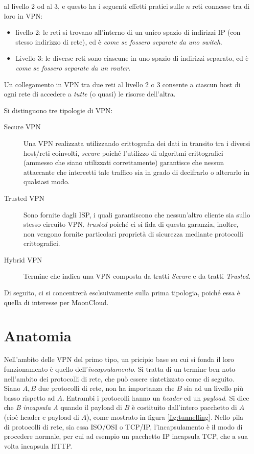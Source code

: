 al livello 2 od al 3, e questo ha i seguenti effetti pratici sulle $n$ reti connesse
tra di loro in VPN:
\begin{itemize}
	\item livello 2: le reti si trovano all'interno di un unico spazio di indirizzi IP
	      (con stesso indirizzo di rete), ed è \textit{come se fossero separate da uno switch}.
	\item Livello 3: le diverse reti sono ciascune in uno spazio di indirizzi separato,
	      ed è \textit{come se fossero separate da un router}.
\end{itemize}
Un collegamento in VPN tra due reti al livello 2 o 3 consente a ciascun host di ogni rete di accedere
a \textit{tutte} (o quasi) le risorse
dell'altra.


Si distinguono tre tipologie di VPN:
\begin{description}
	\item[Secure VPN]Una VPN realizzata utilizzando crittografia dei dati in transito
	tra i diversi host/reti coinvolti, \textit{secure} poiché l'utilizzo di algoritmi
	crittografici (ammesso che siano utilizzati correttamente) garantisce che nessun
	attaccante che intercetti tale traffico sia in grado di decifrarlo o alterarlo in
	qualsiasi modo.
	\item[Trusted VPN]Sono fornite dagli ISP, i quali garantiscono che nessun'altro
	cliente sia sullo stesso circuito VPN, \textit{trusted} poiché ci si fida di
	questa garanzia, inoltre, non vengono fornite particolari proprietà di sicurezza
	mediante protocolli crittografici.
	\item[Hybrid VPN]Termine che indica una VPN composta da tratti \textit{Secure}
	e da tratti \textit{Trusted}.
\end{description}
Di seguito, ci si concentrerà esclsuivamente sulla prima tipologia, poiché essa è
quella di interesse per MoonCloud.


\section{Anatomia}
Nell'ambito delle VPN del primo tipo, un pricipio base su cui si fonda il loro
funzionamento è quello dell'\textit{incapsulamento}. Si tratta di un termine
ben noto nell'ambito dei protocolli di rete, che può essere sintetizzato come
di seguito. Siano $A, B$ due protocolli di rete, non ha importanza
che $B$ sia ad un livello più basso rispetto ad $A$. Entrambi i protocolli hanno un \textit{header} ed un
\textit{payload}.
Si dice che \textit{B incapsula A} quando il payload di $B$ è costituito dall'intero
pacchetto di $A$ (cioè header e payload di $A$), come mostrato in figura \ref{fig:tunnelling}.
Nello pila
di protocolli di rete, sia essa ISO/OSI o TCP/IP, l'incapsulamento è il modo di
procedere normale, per cui ad esempio un pacchetto IP incapsula TCP, che a sua volta
incapsula HTTP.

